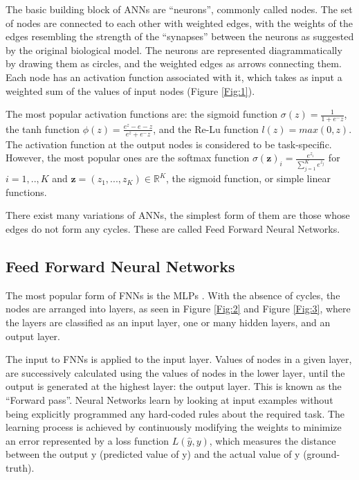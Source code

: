 The basic building block of \ac{ANNs} are \enquote{neurons}, commonly called nodes. The set of nodes are connected to each other with weighted edges, with the weights of the edges resembling the strength of the \enquote{synapses} between the neurons as suggested by the original biological model. 
The neurons are represented diagrammatically by drawing them as circles, and the weighted edges as arrows connecting them.
Each node has an activation function associated with it, which takes as input a weighted sum of the values of input nodes (Figure \ref{Fig:1}). 



The most popular activation functions are: the sigmoid function $  \sigma(z) =  \frac{\mathrm{1} }{\mathrm{1} + e^-z }  $, the tanh function $  \phi(z) =  \frac{ e^z - e-z }{e^z + e^-z }  $, and the Re-Lu function $ l(z) = max(0,z) $. The activation function at the output nodes is considered to be task-specific. However, the most popular ones are the softmax function $ \sigma(\mathbf{z})_i = \frac{ e^ {z_i} }{ \sum_{j=1}^{K} e^{z_j} }$ for $i=1,..,K$ and $\mathbf{z}=(z_1,...,z_K) \in \mathds{R}^K $, the sigmoid function, or simple linear functions.


There exist many variations of \ac{ANNs}, the simplest form of them are those whose edges do not form any cycles. These are called Feed Forward Neural Networks.


\subsection{Feed Forward Neural Networks}
\label{bg:sub1}
The most popular form of \ac{FNNs} is the \ac{MLPs} \cite{rumelhart1985learning} \cite{werbos1988generalization} \cite{bishop1995neural}.
With the absence of cycles, the nodes are arranged into layers, as seen in Figure \ref{Fig:2} and Figure \ref{Fig:3}, where the layers are classified as an input layer, one or many hidden layers, and an output layer. 



The input to \ac{FNNs} is applied to the input layer. Values of nodes in a given layer, are successively calculated using the values of nodes in the lower layer, until the output is generated at the highest layer: the output layer. This is known as the \enquote{Forward pass}.
Neural Networks learn by looking at input examples without being explicitly programmed any hard-coded rules about the required task. The learning process is achieved by continuously modifying the weights to minimize an error represented by a loss function $ L(\widehat{y}, y) $, which measures the distance between the output y (predicted value of y) and the actual value of y (ground-truth).


